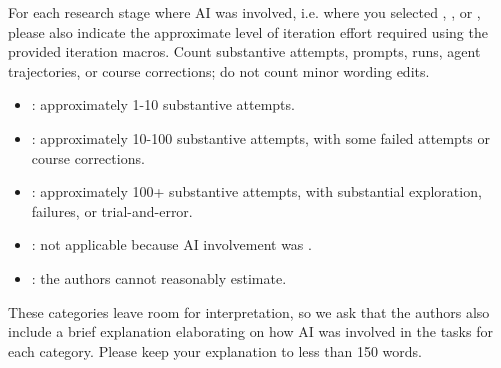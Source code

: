 \documentclass{article}
\begin{document}
For each research stage where AI was involved, i.e. where you selected \involvementB{}, \involvementC{}, or \involvementD{}, please also indicate the approximate level of iteration effort required using the provided iteration macros. Count substantive attempts, prompts, runs, agent trajectories, or course corrections; do not count minor wording edits.

\begin{itemize}
    \item \iterationLow{}: approximately 1-10 substantive attempts.
    \item \iterationMedium{}: approximately 10-100 substantive attempts, with some failed attempts or course corrections.
    \item \iterationHigh{}: approximately 100+ substantive attempts, with substantial exploration, failures, or trial-and-error.
    \item \iterationNA{}: not applicable because AI involvement was \involvementA{}.
    \item \iterationUnclear{}: the authors cannot reasonably estimate.
\end{itemize}

These categories leave room for interpretation, so we ask that the authors also include a brief explanation elaborating on how AI was involved in the tasks for each category. Please keep your explanation to less than 150 words.
\end{document}

